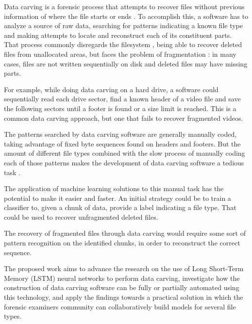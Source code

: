Data carving is a forensic process that attempts to recover files without previous information of where the file starts or ends \cite{garfinkel_carving_2007}.
To accomplish this, a software has to analyze a source of raw data, searching for patterns indicating a known file type and making attempts to locate and reconstruct each of its constituent parts.
That process commonly disregards the filesystem \cite{veenman_statistical_2007}, being able to recover deleted files from unallocated areas, but faces the problem of fragmentation \cite{veenman_statistical_2007}  \cite{pal_evolution_2009}: in many cases, files are not written sequentially on disk and deleted files may have missing parts.

For example, while doing data carving on a hard drive, a software could sequentially read each drive sector, find a known header of a video file and save the following sectors until a footer is found or a size limit is reached. This is a common data carving approach, but one that fails to recover fragmented videos.

The patterns searched by data carving software are generally manually coded, taking advantage of fixed byte sequences found on headers and footers. But the amount of different file types combined with the slow process of manually coding each of those patterns makes the development of data carving software a tedious task \cite{mcdaniel_content_2003}.

The application of machine learning solutions to this manual task has the potential to make it easier and faster. An initial strategy could be to train a classifier to, given a chunk of data, provide a label indicating a file type. That could be used to recover unfragmented deleted files.

The recovery of fragmented files through data carving would require some sort of pattern recognition on the identified chunks, in order to reconstruct the correct sequence.

The proposed work aims to advance the research on the use of Long Short-Term Memory (LSTM) neural networks to perform data carving, investigate how the construction of data carving software can be fully or partially automated using this technology, and apply the findings towards a practical solution in which the forensic examiners community     can collaboratively build models for several file types.

